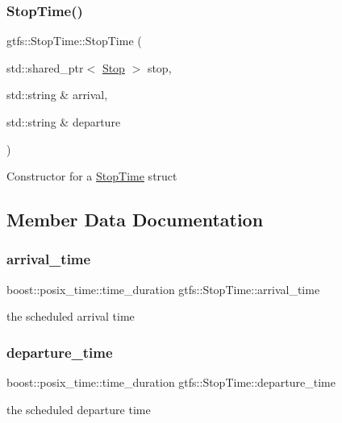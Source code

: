 \subsubsection{\texorpdfstring{Stop\+Time()}{StopTime()}}
{\footnotesize\ttfamily gtfs\+::\+Stop\+Time\+::\+Stop\+Time (\begin{DoxyParamCaption}\item[{std\+::shared\+\_\+ptr$<$ \hyperlink{classgtfs_1_1Stop}{Stop} $>$}]{stop,  }\item[{std\+::string \&}]{arrival,  }\item[{std\+::string \&}]{departure }\end{DoxyParamCaption})\hspace{0.3cm}{\ttfamily [inline]}}

Constructor for a \hyperlink{structgtfs_1_1StopTime}{Stop\+Time} struct 

\subsection{Member Data Documentation}
\mbox{\label{structgtfs_1_1StopTime_a994ec898edd96675200f759acd76a57c}} 
\subsubsection{\texorpdfstring{arrival\+\_\+time}{arrival\_time}}
{\footnotesize\ttfamily boost\+::posix\+\_\+time\+::time\+\_\+duration gtfs\+::\+Stop\+Time\+::arrival\+\_\+time}

the scheduled arrival time \mbox{\label{structgtfs_1_1StopTime_ad11c398eca36ff99f0934883141de3c9}} 
\subsubsection{\texorpdfstring{departure\+\_\+time}{departure\_time}}
{\footnotesize\ttfamily boost\+::posix\+\_\+time\+::time\+\_\+duration gtfs\+::\+Stop\+Time\+::departure\+\_\+time}

the scheduled departure time \mbox{\label{structgtfs_1_1StopTime_af8cc780329a837a49a5d6af60b74b9bf}} 
